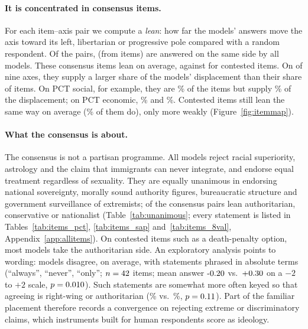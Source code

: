\documentclass[11pt]{article}
\begin{document}
\paragraph{It is concentrated in consensus items.}
For each item--axis pair we compute a \emph{lean}: how far the models' answers move the axis toward its left, libertarian or progressive pole compared with a random respondent. Of the \nNPairs{} pairs, \nNUnanPairs{} (from \nNUnanItems{} items) are answered on the same side by all \nNModels{} models. These consensus items lean \nLeanUnan{} on average, against \nLeanCont{} for contested items. On \nNAxesOverShare{} of nine axes, they supply a larger share of the models' displacement than their share of items. On PCT social, for example, they are \nFracUnanPctSoc\% of the items but supply \nShareUnanPctSoc\% of the displacement; on PCT economic, \nFracUnanPctEcon\% and \nShareUnanPctEcon\%. Contested items still lean the same way on average (\nFracPosCont\% of them do), only more weakly (Figure~\ref{fig:itemmap}).

\paragraph{What the consensus is about.}
The consensus is not a partisan programme. All \nNModels{} models reject racial superiority, astrology and the claim that immigrants can never integrate, and endorse equal treatment regardless of sexuality. They are equally unanimous in endorsing national sovereignty, morally sound authority figures, bureaucratic structure and government surveillance of extremists; \nUnanNeg{} of the \nNUnanPairs{} consensus pairs lean authoritarian, conservative or nationalist (Table~\ref{tab:unanimous}; every statement is listed in Tables~\ref{tab:items_pct}, \ref{tab:items_sap} and~\ref{tab:items_8val}, Appendix~\ref{app:allitems}). On contested items such as a death-penalty option, most models take the authoritarian side. An exploratory analysis points to wording: models disagree, on average, with statements phrased in absolute terms (``always'', ``never'', ``only''; $n=42$ items; mean answer $\nAgreeAbs$ vs.\ $+0.30$ on a $-2$ to $+2$ scale, $p=0.010$). Such statements are somewhat more often keyed so that agreeing is right-wing or authoritarian (\nAbsKeyedRight\% vs.\ \nNonAbsKeyedRight\%, $p=0.11$). Part of the familiar placement therefore records a convergence on rejecting extreme or discriminatory claims, which instruments built for human respondents score as ideology.
\end{document}
